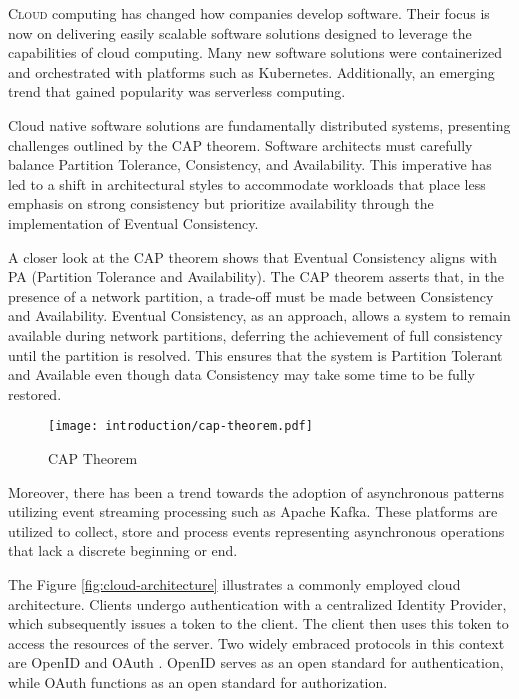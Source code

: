 \lettrine{C}{loud} computing has changed how companies develop software. Their focus is now on delivering easily scalable software solutions designed to leverage the capabilities of cloud computing.
Many new software solutions were containerized and orchestrated with platforms such as Kubernetes. Additionally, an emerging trend that gained popularity was serverless computing.

Cloud native software solutions are fundamentally distributed systems, presenting challenges outlined by the CAP theorem. Software architects must carefully balance Partition Tolerance, Consistency, and Availability.
This imperative has led to a shift in architectural styles to accommodate workloads that place less emphasis on strong consistency but prioritize availability through the implementation of Eventual Consistency.

\begin{boxF}
    A closer look at the CAP theorem shows that Eventual Consistency aligns with PA (Partition Tolerance and Availability).
    The CAP theorem \cite{c1} asserts that, in the presence of a network partition, a trade-off must be made between Consistency and Availability.
    Eventual Consistency, as an approach, allows a system to remain available during network partitions, deferring the achievement of full consistency until the partition is resolved.
    This ensures that the system is Partition Tolerant and Available even though data Consistency may take some time to be fully restored.
\end{boxF}

\begin{figure}[h]
    \centering
    \texttt{[image: introduction/cap-theorem.pdf]}
    \caption{CAP Theorem}
    \label{fig:cap-theorem}
\end{figure}

Moreover, there has been a trend towards the adoption of asynchronous patterns utilizing event streaming processing such as Apache Kafka.
These platforms are utilized to collect, store and process events representing asynchronous operations that lack a discrete beginning or end.

The Figure \ref{fig:cloud-architecture} illustrates a commonly employed cloud architecture. Clients undergo authentication with a centralized Identity Provider, which subsequently issues a token to the client.
The client then uses this token to access the resources of the server.
Two widely embraced protocols in this context are OpenID \cite{c4} and OAuth \cite{c5}. OpenID serves as an open standard for authentication, while OAuth functions as an open standard for authorization.

